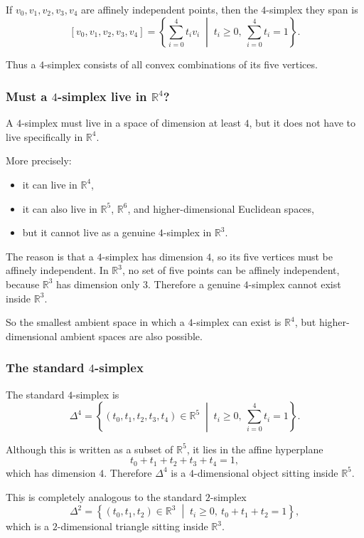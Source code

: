 \documentclass[12pt,a4paper]{article}
\theoremstyle{notespace}
\begin{document}
If \(v_0,v_1,v_2,v_3,v_4\) are affinely independent points, then the \(4\)-simplex they span is
\[
[v_0,v_1,v_2,v_3,v_4]
=
\left\{
\sum_{i=0}^4 t_i v_i
\;\middle|\;
t_i\ge 0,\ \sum_{i=0}^4 t_i=1
\right\}.
\]

Thus a \(4\)-simplex consists of all convex combinations of its five vertices.

\subsubsection{Must a \(4\)-simplex live in \(\mathbb{R}^4\)?}

A \(4\)-simplex must live in a space of dimension at least \(4\), but it does not have to live specifically in \(\mathbb{R}^4\).

More precisely:
\begin{itemize}
	\item it can live in \(\mathbb{R}^4\),
	\item it can also live in \(\mathbb{R}^5\), \(\mathbb{R}^6\), and higher-dimensional Euclidean spaces,
	\item but it cannot live as a genuine \(4\)-simplex in \(\mathbb{R}^3\).
\end{itemize}

The reason is that a \(4\)-simplex has dimension \(4\), so its five vertices must be affinely independent. In \(\mathbb{R}^3\), no set of five points can be affinely independent, because \(\mathbb{R}^3\) has dimension only \(3\). Therefore a genuine \(4\)-simplex cannot exist inside \(\mathbb{R}^3\).

So the smallest ambient space in which a \(4\)-simplex can exist is \(\mathbb{R}^4\), but higher-dimensional ambient spaces are also possible.

\subsubsection{The standard \(4\)-simplex}

The standard \(4\)-simplex is
\[
\Delta^4
=
\left\{
(t_0,t_1,t_2,t_3,t_4)\in \mathbb{R}^5
\;\middle|\;
t_i\ge 0,\ \sum_{i=0}^4 t_i=1
\right\}.
\]

Although this is written as a subset of \(\mathbb{R}^5\), it lies in the affine hyperplane
\[
t_0+t_1+t_2+t_3+t_4=1,
\]
which has dimension \(4\). Therefore \(\Delta^4\) is a \(4\)-dimensional object sitting inside \(\mathbb{R}^5\).

This is completely analogous to the standard \(2\)-simplex
\[
\Delta^2
=
\left\{
(t_0,t_1,t_2)\in \mathbb{R}^3
\;\middle|\;
t_i\ge 0,\ t_0+t_1+t_2=1
\right\},
\]
which is a \(2\)-dimensional triangle sitting inside \(\mathbb{R}^3\).
\end{document}
